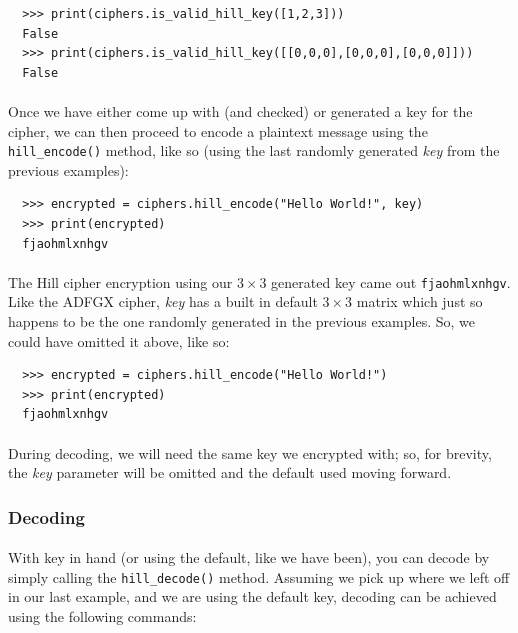 \documentclass[12pt,a4paper]{article}
\begin{document}
\begin{verbatim}
  >>> print(ciphers.is_valid_hill_key([1,2,3]))
  False
  >>> print(ciphers.is_valid_hill_key([[0,0,0],[0,0,0],[0,0,0]]))
  False
\end{verbatim}

\paragraph{}
Once we have either come up with (and checked) or generated a key for the 
cipher, we can then 
proceed to encode a plaintext message using the \verb|hill_encode()| method, 
like so (using the last randomly generated \textit{key} from the previous 
examples):

\begin{verbatim}
  >>> encrypted = ciphers.hill_encode("Hello World!", key)
  >>> print(encrypted)
  fjaohmlxnhgv
\end{verbatim}

\paragraph{}
The Hill cipher encryption using our $3 \times 3$ generated key came out 
\verb|fjaohmlxnhgv|.  Like the ADFGX cipher, \textit{key} has a built in 
default $3 \times 3$ matrix which just so happens to be the one randomly 
generated in the previous examples.  So, we could have omitted it above, 
like so:

\begin{verbatim}
  >>> encrypted = ciphers.hill_encode("Hello World!")
  >>> print(encrypted)
  fjaohmlxnhgv
\end{verbatim}

\paragraph{}
During decoding, we will need the same key we encrypted with; so, for brevity, 
the \textit{key} parameter will be omitted and the default used moving forward.

\subsubsection{Decoding}
\paragraph{}
With key in hand (or using the default, like we have been), you can decode by 
simply calling the \verb|hill_decode()| method.  Assuming we pick up where we 
left off in our last example, and we are using the default key, decoding can be 
achieved using the following commands:
\end{document}
